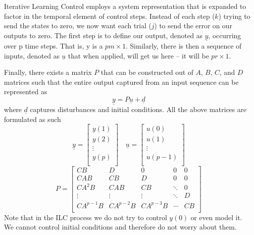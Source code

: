 Iterative Learning Control employs a system representation that is expanded to factor in the temporal element of control steps. Instead of each step ($k$) trying to send the states to zero, we now want each trial ($j$) to send the error on our outputs to zero. 
The first step is to define our output, denoted as $\underline{y}$, occurring over p time steps. That is, y is a $pm\times 1$. Similarly, there is then a sequence of inputs, denoted as $\underline{u}$ that when applied, will get us here -- it will be $pr\times 1$. 

Finally, there exists a matrix $P$ that can be constructed out of $A$, $B$, $C$, and $D$ matrices such that the entire output captured from an input sequence can be represented as 
\begin{equation}
    \underline{y}=P\underline{u}+\underline{d}
    \label{eq:y_Pu_d}
\end{equation}
where $\underline{d}$ captures disturbances and initial conditions. All the above matrices are formulated as such
\begin{equation}
    \underline{y}=\left[\begin{matrix}y\left(1\right)\\y\left(2\right)\\\vdots\\y\left(p\right)\\\end{matrix}\right]
    \quad
    \underline{u}=\left[\begin{matrix}u\left(0\right)\\u\left(1\right)\\\vdots\\u\left(p-1\right)\\\end{matrix}\right]
    \label{eq:y_u_stacks}
\end{equation}
\begin{equation}
    P=\left[\begin{matrix}CB&D&0&0&0\\CAB&CB&D&0&0\\CA^2B&CAB&CB&\ddots&0\\\vdots&\vdots&\vdots&\ddots&D\\CA^{p-1}B&CA^{p-2}B&CA^{p-3}B&\cdots&CB\\\end{matrix}\right]
    \label{ILC_P}
\end{equation}
Note that in the ILC process we do not try to control $y\left(0\right)$ or even model it. We cannot control initial conditions and therefore do not worry about them.
